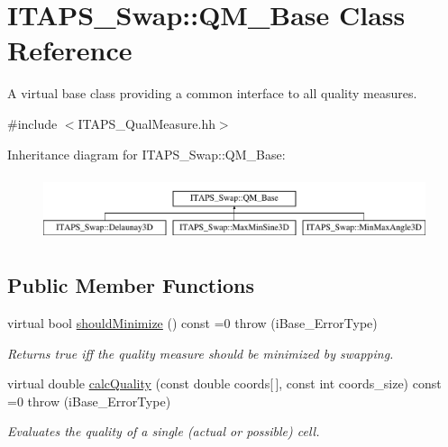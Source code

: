 \hypertarget{class_i_t_a_p_s___swap_1_1_q_m___base}{
\section{ITAPS\_\-Swap::QM\_\-Base Class Reference}
\label{class_i_t_a_p_s___swap_1_1_q_m___base}
}


A virtual base class providing a common interface to all quality measures.  




{\ttfamily \#include $<$ITAPS\_\-QualMeasure.hh$>$}

Inheritance diagram for ITAPS\_\-Swap::QM\_\-Base:\begin{figure}[H]
\begin{center}
\leavevmode
\includegraphics[height=1.93437cm]{class_i_t_a_p_s___swap_1_1_q_m___base}
\end{center}
\end{figure}
\subsection*{Public Member Functions}
\begin{DoxyCompactItemize}
\item 
\hypertarget{class_i_t_a_p_s___swap_1_1_q_m___base_a9d7415385a5f0a03eb00553864a48789}{
virtual bool \hyperlink{class_i_t_a_p_s___swap_1_1_q_m___base_a9d7415385a5f0a03eb00553864a48789}{shouldMinimize} () const =0  throw (iBase\_\-ErrorType)}
\label{class_i_t_a_p_s___swap_1_1_q_m___base_a9d7415385a5f0a03eb00553864a48789}

\begin{DoxyCompactList}\small\item\em Returns true iff the quality measure should be minimized by swapping. \item\end{DoxyCompactList}\item 
virtual double \hyperlink{class_i_t_a_p_s___swap_1_1_q_m___base_aea047b3afc06b75a1115bbaddd8286ee}{calcQuality} (const double coords\mbox{[}$\,$\mbox{]}, const int coords\_\-size) const =0  throw (iBase\_\-ErrorType)
\begin{DoxyCompactList}\small\item\em Evaluates the quality of a single (actual or possible) cell. \item\end{DoxyCompactList}\end{DoxyCompactItemize}


